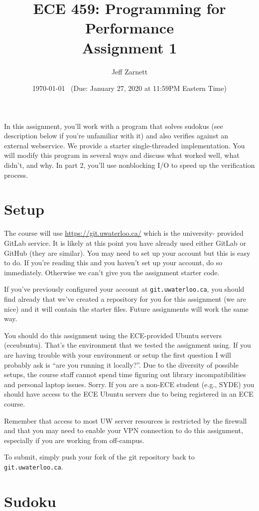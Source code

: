 \documentclass[letterpaper,10pt]{article}
\title{\bf ECE 459: Programming for Performance\\Assignment 1}
\author{Jeff Zarnett}
\date{\today ~ (Due: January 27, 2020 at 11:59PM Eastern Time)}
\begin{document}
\maketitle

In this assignment, you'll work with a program that solves sudokus 
(see description below if you're unfamiliar with it) and 
also verifies against an external webservice. We provide a starter
single-threaded implementation. You will modify this program in several
ways and discuss what worked well, what didn't, and why.
In part 2, you'll use nonblocking I/O to speed up the verification process.

\section*{Setup}


The course will use \url{https://git.uwaterloo.ca/} which is the university-
provided GitLab service. It is likely at this point you have already used 
either GitLab or GitHub (they are similar). You may need to set up your 
account but this is easy to do. If you're reading this and you haven't set up 
your account, do so immediately. Otherwise we can't give you the assignment 
starter code.

If you've previously configured your account at {\tt git.uwaterloo.ca}, you 
should find already that we've created a repository for you for this 
assignment (we are nice) and it will contain the starter files. Future 
assignments will work the same way.

You should do this assignment using the ECE-provided Ubuntu servers 
(eceubuntu). That's the environment that we tested the
assignment using. If you are having trouble with your environment or setup
the first question I will probably ask is ``are you running it locally?''.
Due to the diversity of possible setups, the course staff cannot spend
time figuring out library incompatibilities and personal laptop issues.
Sorry. If you are a non-ECE student (e.g., SYDE) you should have
access to the ECE Ubuntu servers due to being registered in an ECE course.

Remember that access to most UW server resources is restricted by the firewall 
and that you may need to enable your VPN connection to do this assignment, 
especially if you are working from off-campus.

To submit, simply push your fork of the git repository back to {\tt git.uwaterloo.ca}.

\section*{Sudoku}
\end{document}
